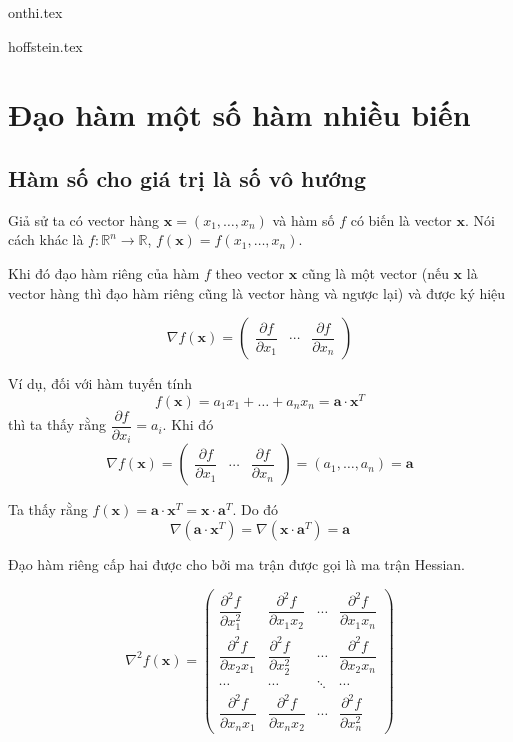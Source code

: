 \documentclass{mynotes}
\newcommand{\RR}{\mathbb{R}}
\begin{document}
\appendix

{onthi.tex}

{hoffstein.tex}

\chapter{Đạo hàm một số hàm nhiều biến}

\section*{Hàm số cho giá trị là số vô hướng}
	
Giả sử ta có vector hàng $\bm{x} = (x_1, \ldots, x_n)$ và hàm số $f$ có biến là vector $\bm{x}$. Nói cách khác là $f: \RR^n \to \RR$, $f(\bm{x}) = f(x_1, \ldots, x_n)$.

Khi đó đạo hàm riêng của hàm $f$ theo vector $\bm{x}$ cũng là một vector (nếu $\bm{x}$ là vector hàng thì đạo hàm riêng cũng là vector hàng và ngược lại) và được ký hiệu

\begin{equation*}
    \nabla f(\bm{x}) = \begin{pmatrix}
        \dfrac{\partial f}{\partial x_1} & \cdots & \dfrac{\partial f}{\partial x_n}
    \end{pmatrix}
\end{equation*}

Ví dụ, đối với hàm tuyến tính \[ f(\bm{x}) = a_1 x_1 + \ldots + a_n x_n = \bm{a} \cdot \bm{x}^T \] thì ta thấy rằng $\dfrac{\partial f}{\partial x_i} = a_i$. Khi đó \[ \nabla f (\bm{x}) = \begin{pmatrix}
    \dfrac{\partial f}{\partial x_1} & \cdots & \dfrac{\partial f}{\partial x_n}
\end{pmatrix} = (a_1, \ldots, a_n) = \bm{a}\]

Ta thấy rằng $f(\bm{x}) = \bm{a} \cdot \bm{x}^T = \bm{x} \cdot \bm{a}^T$. Do đó \[\nabla (\bm{a} \cdot \bm{x}^T) = \nabla (\bm{x} \cdot \bm{a}^T) = \bm{a}\]

Đạo hàm riêng cấp hai được cho bởi ma trận được gọi là ma trận Hessian.

\begin{equation*}
    \nabla^2 f(\bm{x}) = \begin{pmatrix}
        \dfrac{\partial^2 f}{\partial x_1^2} & \dfrac{\partial^2 f}{\partial x_1 x_2} & \cdots & \dfrac{\partial^2 f}{\partial x_1 x_n} \\ \dfrac{\partial^2 f}{\partial x_2 x_1} & \dfrac{\partial^2 f}{\partial x_2^2} & \cdots & \dfrac{\partial^2 f}{\partial x_2 x_n} \\ \cdots & \cdots & \ddots & \cdots \\ \dfrac{\partial^2 f}{\partial x_n x_1} & \dfrac{\partial^2 f}{\partial x_n x_2} & \cdots & \dfrac{\partial^2 f}{\partial x_n^2}
    \end{pmatrix}
\end{equation*}
\end{document}
